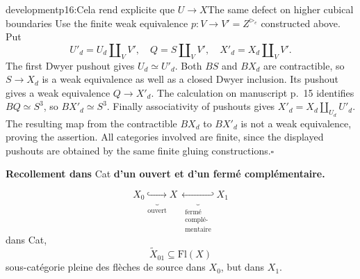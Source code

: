 \begin{dcomment}{development}{p16:Cela rend explicite que $U \longrightarrow X$}{The same defect on higher cubical boundaries}
Use the finite weak equivalence $p:V\to V'=Z^{\triangleright_e}$ constructed above. Put
\[
 U'_d=U_d\amalg_VV',\quad Q=S\amalg_VV',\quad
 X'_d=X_d\amalg_VV'.
\]
The first Dwyer pushout gives $U_d\simeq U'_d$. Both $BS$ and $BX_d$ are contractible, so $S\to X_d$ is a weak equivalence as well as a closed Dwyer inclusion. Its pushout gives a weak equivalence $Q\to X'_d$. The calculation on manuscript p.~15 identifies $BQ\simeq S^3$, so $BX'_d\simeq S^3$. Finally associativity of pushouts gives $X'_d=X_d\amalg_{U_d}U'_d$. The resulting map from the contractible $BX_d$ to $BX'_d$ is not a weak equivalence, proving the assertion. All categories involved are finite, since the displayed pushouts are obtained by the same finite gluing constructions.\hfill$\square$
\end{dcomment}


\textbf{Recollement dans} Cat \textbf{d'un ouvert et d'un fermé complémentaire.}


\[ X_0 \underbrace{\hookrightarrow}_{\text{ouvert}} X \ \underbrace{\hookleftarrow}_{\substack{\text{fermé}\\ \text{complé-}\\ \text{mentaire}}} X_1 \]
dans Cat,
\[ \tilde{X}_{01} \subseteq \mathrm{Fl}(X) \]
 sous-catégorie pleine des flèches de source dans $X_0$, but dans $X_1$.


